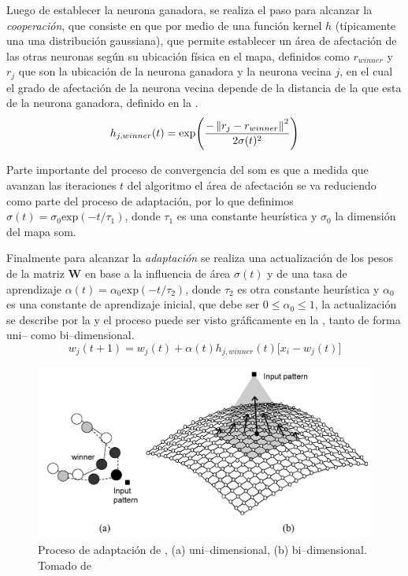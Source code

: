 Luego de establecer la neurona ganadora, se realiza el paso para alcanzar la \emph{cooperación}, que consiste en que por medio de una función kernel $h$ (típicamente una una distribución gaussiana), que permite establecer un área de afectación de las otras neuronas según su ubicación física en el mapa, definidos como $r_{winner}$ y $r_j$ que son la ubicación de la neurona ganadora y la neurona vecina $j$, en el cual el grado de afectación de la neurona vecina depende de la distancia de la que esta de la neurona ganadora, definido en la .
\begin{equation} \label{eq:som-cooperation}
  h_{j, winner}(t) = \text{exp}\Bigg(\frac{- \left\lVert r_j - r_{winner}\right\rVert^2}{ 2 \sigma(t)^2}\Bigg)
\end{equation}

Parte importante del proceso de convergencia del \gls{som} es que a medida que avanzan las iteraciones $t$ del algoritmo el área de afectación se va reduciendo como parte del proceso de adaptación, por lo que definimos $\sigma(t) = \sigma_0 \text{exp}(-t / \tau_1)$, donde $\tau_1$ es una constante heurística y $\sigma_0$ la dimensión del mapa \gls{som}.

Finalmente para alcanzar la \emph{adaptación} se realiza una actualización de los pesos de la matriz $\mathbf{W}$ en base a la influencia de área $\sigma(t)$ y de una tasa de aprendizaje $\alpha(t) = \alpha_0 \text{exp}(-t/ \tau_2)$, donde $\tau_2$ es otra constante heurística y $\alpha_0$ es una constante de aprendizaje inicial, que debe ser $0 \le \alpha_0 \le 1$, la actualización se describe por la  y el proceso puede ser visto gráficamente en la , tanto de forma uni-- como bi--dimensional.
\begin{equation} \label{eq:som-adaptation}
  w_j(t+1) = w_j(t) + \alpha(t) h_{j, winner}(t)\Big[x_i-w_j(t)\Big]
\end{equation}

\begin{figure}[H]
\centering
\includegraphics[scale=0.2]{Figures/som-adaptive-proc.png}
\decoRule
\caption[Proceso de adaptación de ]{Proceso de adaptación de , (a) uni--dimensional, (b) bi--dimensional. Tomado de \cite{de2006fundamentals}}
\label{fig:som-adap-proc}
\end{figure}

